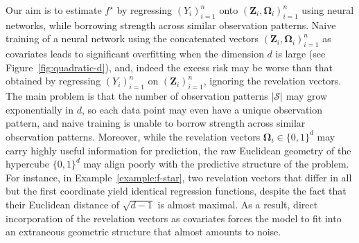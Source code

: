 \documentclass[12pt]{article}
\begin{document}

Our aim is to estimate $f^{\star}$ by regressing $(Y_i)_{i=1}^n$ onto $(\bm Z_i,\bm\Omega_i)_{i=1}^n$ using neural networks, while borrowing strength across similar observation patterns.  Naive training of a neural network using the concatenated vectors $(\bm Z_i,\bm\Omega_i)_{i=1}^n$ as covariates leads to significant overfitting when the dimension $d$ is large (see Figure~\ref{fig:quadratic-d}), and, indeed the excess risk may be worse than that obtained by regressing $(Y_i)_{i=1}^n$ on $(\bm Z_i)_{i=1}^n$, ignoring the revelation vectors.  The main problem is that the number of observation patterns $|\mathcal{S}|$ may grow exponentially in $d$, so each data point may even have a unique observation pattern, and naive training is unable to borrow strength across similar observation patterns.  Moreover, while the revelation vectors $\bm\Omega_i\in\{0,1\}^d$ may carry highly useful information for prediction, the raw Euclidean geometry of the hypercube $\{0,1\}^d$ may align poorly with the predictive structure of the problem. For instance, in Example~\ref{example:f-star}, two revelation vectors that differ in all but the first coordinate yield identical regression functions, despite the fact that their Euclidean distance of $\sqrt{d-1}$ is almost maximal. As a result, direct incorporation of the revelation vectors as covariates forces the model to fit into an extraneous geometric structure that almost amounts to noise. 
\end{document}
